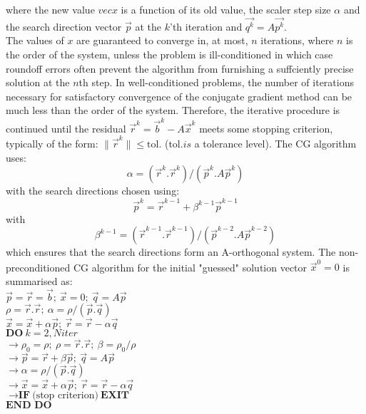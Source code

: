 where  the new value $vec{x}$ is a function of its old value, the scaler step size $\alpha$ and the search direction vector $\vec{p}$ at the $k$'th iteration and $\vec{q^k}=A\vec{p^k}$.
\\
The values of $x$ are guaranteed to converge in, at most, $n$ iterations, where $n$ is the order of the system, unless the problem is ill-conditioned in which case roundoff errors often prevent the algorithm from furnishing a suffciently precise solution at the $n$th step. In well-conditioned problems, the number of iterations necessary for satisfactory convergence of the conjugate gradient method can be much less than the order of the system. Therefore, the iterative procedure is continued until the residual $\vec{r}^k=\vec{b}^k-A\vec{x}^k$ meets some stopping criterion, typically of the form: $\| \vec{r}^k \| \leq \text{tol.}$ ($\text{tol.} is$ a tolerance level). The CG algorithm uses:
\begin{equation}
\alpha = (\vec{r}^k . \vec{r}^k ) / (\vec{p}^k . A \vec{p}^k)
\label{eq:CGalpha}
\end{equation}
with the search directions chosen using:
\begin{equation}
\vec{p}^k=\vec{r}^{k-1}+ \beta^{k-1} \vec{p}^{k-1}
\label{eq:CGsearchDir}
\end{equation}
with 
\begin{equation}
\beta^{k-1}= ( \vec{r}^{k-1} . \vec{r}^{k-1} ) / ( \vec{p}^{k-2} . A \vec{p}^{k-2} )
\label{eq:CGbeta}
\end{equation}
which ensures that the search directions form an A-orthogonal system.
The non-preconditioned CG algorithm for the initial "guessed" solution vector $\vec{x}^0 = 0$ is summarised as:
\\
$\vec{p} =\vec{r}=\vec{b}; \ \vec{x}=0 ; \ \vec{q}=A \vec{p}$ \\
$\rho = \vec{r} . \vec{r} ; \ \alpha = \rho /( \vec{p} . \vec{q} )$\\
$\vec{x} = \vec{x} + \alpha \vec{p} ; \ \vec{r}= \vec{r} - \alpha \vec{q}$\\
$ \textbf{DO} \ k=2,Niter$\\
$ \rightarrow \rho_0 = \rho ; \ \rho= \vec{r} . \vec{r} ; \ \beta = \rho_0 / \rho $\\
$ \rightarrow  \vec{p}=\vec{r} + \beta \vec{p} ; \ \vec{q}= A \vec{p}$ \\
$ \rightarrow  \alpha = \rho / ( \vec{p} . \vec{q})$\\
$ \rightarrow  \vec{x}=\vec{x}+\alpha \vec{p}; \ \vec{r}=\vec{r}-\alpha\vec{q}$\\
$ \rightarrow  \textbf{IF} \  \text{(stop criterion)} \ \textbf{EXIT} $\\
$ \textbf{END DO}$\\

